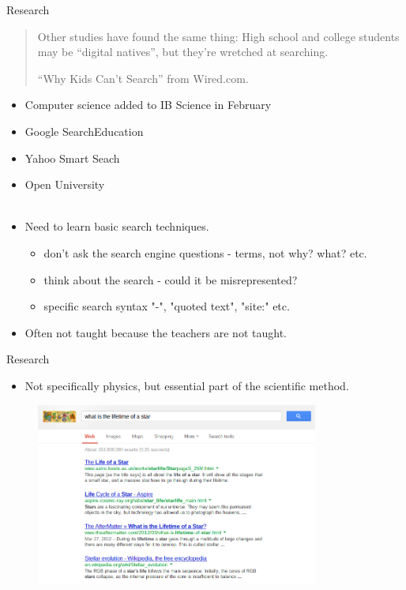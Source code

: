 \documentclass{beamer}
\begin{document}
\begin{frame}{Research}
    \begin{quote}
        Other studies have found the same thing: High school and college students may be ``digital natives'', but they're wretched at searching.
        
        \hfill \tiny{``Why Kids Can't Search'' from Wired.com.}
    \end{quote}
    \pause
    \begin{itemize}[<+->]
        \item Computer science added to IB Science in February
        \item Google SearchEducation
        \item Yahoo Smart Seach
        \item Open University
        \\~\\
        \item Need to learn basic search techniques.
        \begin{itemize}
            \item<1-> don't ask the search engine questions - terms, not why? what? etc.
            \item<1-> think about the search - could it be misrepresented?
            \item<1-> specific search syntax "-", "quoted text", "site:" etc.
        \end{itemize}
        \item Often not taught because the teachers are not taught.
    \end{itemize}
\end{frame}

\begin{frame}{Research}
    \begin{itemize}
        \item Not specifically physics, but essential part of the scientific method.
    \end{itemize} 
    \pause
    \begin{figure}
        \includegraphics[height=6cm]{google_search.png}
    \end{figure}
\end{frame}
\end{document}
